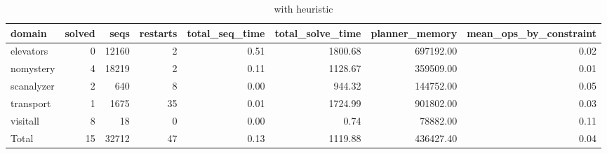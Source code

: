\begin{table*}[htbp]
\centering
\begingroup\small
\begin{tabular}{lrrrrrrr}
  \hline
domain & solved & seqs & restarts & total\_seq\_time & total\_solve\_time & planner\_memory & mean\_ops\_by\_constraint \\ 
  \hline
elevators &   0 & 12160 &   2 & 0.51 & 1800.68 & 697192.00 & 0.02 \\ 
  nomystery &   4 & 18219 &   2 & 0.11 & 1128.67 & 359509.00 & 0.01 \\ 
  scanalyzer &   2 & 640 &   8 & 0.00 & 944.32 & 144752.00 & 0.05 \\ 
  transport &   1 & 1675 &  35 & 0.01 & 1724.99 & 901802.00 & 0.03 \\ 
  visitall &   8 &  18 &   0 & 0.00 & 0.74 & 78882.00 & 0.11 \\ 
  Total &  15 & 32712 &  47 & 0.13 & 1119.88 & 436427.40 & 0.04 \\ 
   \hline
\end{tabular}
\endgroup
\caption{\oursolver{} with \hstar{} heuristic} 
\label{tab:selected_hstar}
\end{table*}
